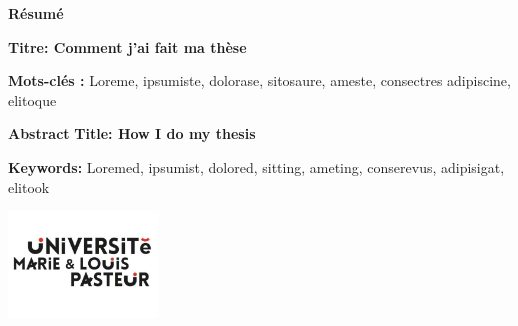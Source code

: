 \newpage
\thispagestyle{empty}

\hrulefill
\vspace*{2mm}
\par\noindent\textbf
{\color{blue}\Large\bfseries Résumé }

{\bfseries{} Titre:  Comment j'ai fait ma thèse}


\vspace*{2mm}

\vspace*{0.5mm}
\par\noindent\textbf
{\bfseries {Mots-clés :}}
Loreme, ipsumiste, dolorase, sitosaure, ameste, consectres adipiscine, elitoque

\vspace*{0.5mm}
\hrulefill
\vspace*{2mm}




\par\noindent\textbf{\color{blue}\Large\bfseries Abstract } {\bfseries  {} Title:  How I do my thesis}


\vspace*{1mm}
\par\noindent\textbf
{\bfseries {Keywords:}}
Loremed, ipsumist, dolored, sitting, ameting, conserevus, adipisigat, elitook

\includegraphics[width=4cm]{MainLayout/Images/chapter0/logo_univ.pdf}